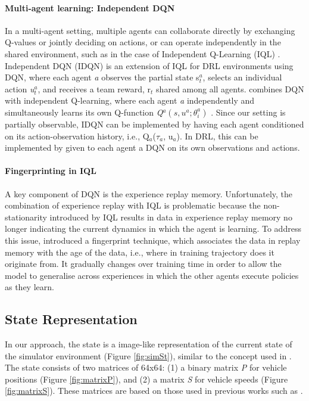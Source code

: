 \documentclass{llncs}
\begin{document}
\paragraph{\textbf{Multi-agent learning: Independent DQN}}
In a multi-agent setting, multiple agents can collaborate directly by exchanging Q-values or jointly deciding on actions, or can operate independently in the shared environment, such as in the case of Independent Q-Learning (IQL) \cite{Tan1993}. Independent DQN (IDQN) is an extension of IQL for DRL environments using DQN, where each agent \textit{a} observes the partial state s$_{t}^{a}$, selects an individual action \textit{u$_{t}^{a}$}, and receives a team reward, r$_{t}$ shared among all agents. \cite{Tampuu2015} combines DQN with independent Q-learning, where each agent \textit{a} independently and simultaneously learns its own Q-function \textit{Q$^{a}(s, u^{a};\theta^{a}_{i})$} \cite{DBLP:journals/corr/FoersterAFW16a}. Since our setting is partially observable, IDQN can be implemented by having each agent conditioned on its action-observation history, i.e., Q$_{a}$($\tau_{a}$, u$_{a}$). In DRL, this can be implemented by given to each agent a DQN on its own observations and actions.

\paragraph{\textbf{Fingerprinting in IQL}}

A key component of DQN is the experience replay memory.  Unfortunately, the combination of experience replay with IQL is problematic because the non-stationarity introduced by IQL results in data in experience replay memory no longer indicating the current dynamics in which the agent is learning. To address this issue, \cite{Foerster2017} introduced a fingerprint technique, which associates the data in replay memory with the age of the data, i.e., where in training trajectory does it originate from. It gradually changes over training time in order to allow the model to generalise across experiences in which the other agents execute policies as they learn.

\subsection{State Representation}\label{sec:stateRep}

In our approach, the state is a image-like representation of the current state of the simulator environment (Figure \ref{fig:simSt}), similar to the concept used in \cite{Mnih2015}. The state consists of two matrices of 64x64: (1) a binary matrix \textit{P} for vehicle positions (Figure \ref{fig:matrixP}), and (2) a matrix \textit{S} for vehicle speeds (Figure \ref{fig:matrixS}). These matrices are based on those used in previous works such as \cite{Liang2018,Liu2017CooperativeDR,VanDerPol2016}. 
	
\end{document}
